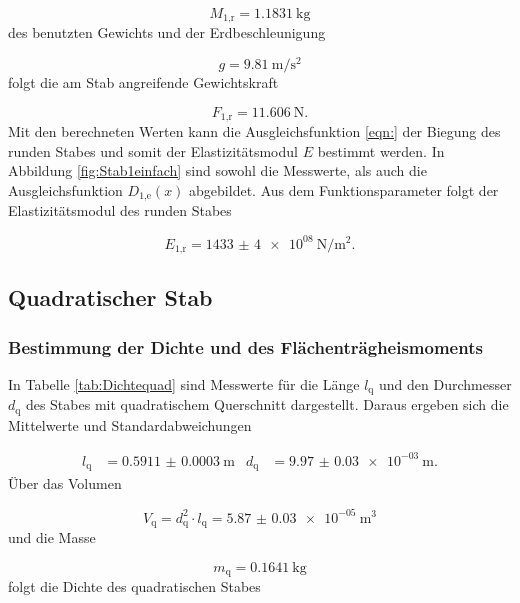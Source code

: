 \begin{equation}
  M_\text{1,r} = \SI{1.1831}{\kilo\gram}
\end{equation}
des benutzten Gewichts und der Erdbeschleunigung

\begin{equation}
  g = \SI{9.81}{\meter\per\second\squared}
  \label{eqn:Erdbeschl}
\end{equation}
folgt die am Stab angreifende Gewichtskraft

\begin{equation}
  F_\text{1,r} = \SI{11.606}{\newton}.
\end{equation}
Mit den berechneten Werten kann die Ausgleichsfunktion \eqref{eqn:} der Biegung
des runden Stabes und somit der Elastizitätsmodul $E$ bestimmt werden.
In Abbildung \ref{fig:Stab1einfach} sind sowohl die Messwerte, als auch die
Ausgleichsfunktion $D_\text{1,e}(x)$ abgebildet.
Aus dem Funktionsparameter folgt der Elastizitätsmodul des runden Stabes

\begin{equation}
  E_\text{1,r} = \SI{1433(4)e08}{\newton\per\meter\squared}.
\end{equation}

\subsection{Quadratischer Stab}

\subsubsection{Bestimmung der Dichte und des Flächenträgheismoments}

In Tabelle \ref{tab:Dichtequad} sind Messwerte für die Länge $l_\text{q}$ und
den Durchmesser $d_\text{q}$ des Stabes mit
quadratischem Querschnitt dargestellt.
Daraus ergeben sich die Mittelwerte und Standardabweichungen

\begin{align}
  l_\text{q} & = \SI{0.5911(3)}{\meter} & d_\text{q} & = \SI{9.97(3)e-03}{\meter}.
\end{align}
Über das Volumen

\begin{equation}
  V_\text{q} = d_\text{q}^2 \cdot l_\text{q} = \SI{5.87(3)e-05}{\cubic\meter}
\end{equation}
und die Masse

\begin{equation}
  m_\text{q} = \SI{0.1641}{\kilo\gram}
\end{equation}
folgt die Dichte des quadratischen Stabes

